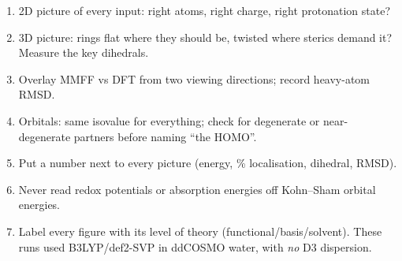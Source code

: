 \documentclass[11pt,a4paper]{article}
\begin{document}
\begin{enumerate}
  \item 2D picture of every input: right atoms, right charge, right protonation state?
  \item 3D picture: rings flat where they should be, twisted where sterics demand it? Measure
  the key dihedrals.
  \item Overlay MMFF vs DFT from two viewing directions; record heavy-atom RMSD.
  \item Orbitals: same isovalue for everything; check for degenerate or near-degenerate partners
  before naming ``the HOMO''.
  \item Put a number next to every picture (energy, \% localisation, dihedral, RMSD).
  \item Never read redox potentials or absorption energies off Kohn--Sham orbital energies.
  \item Label every figure with its level of theory (functional/basis/solvent). These runs used
  B3LYP/def2-SVP in ddCOSMO water,
  with \emph{no} D3 dispersion.
\end{enumerate}
\end{document}
